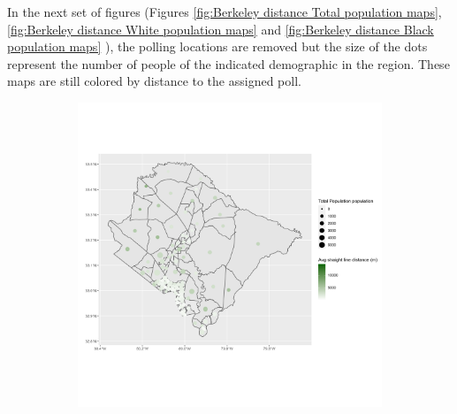 \documentclass[11pt]{article}
\theoremstyle{remark}
\theoremstyle{definition}
\begin{document}
In the next set of figures (Figures \ref{fig:Berkeley distance Total population maps}, \ref{fig:Berkeley distance White population maps} and \ref{fig:Berkeley distance Black population maps} ), the polling locations are removed but the size of the dots represent the number of people of the indicated demographic in the region. These maps are still colored by distance to the assigned poll.

\begin{figure}
	\begin{subfigure}{.5\textwidth}
		\centering
		\includegraphics[width=\linewidth]{result analysis/Berkeley_SC_original_configs/population_pop_and_dist_Berkeley_config_original_2016_polls.png}
		\label{sfig:York_2016_bg_dist_pop}
	\end{subfigure} 
	\begin{subfigure}{.5\textwidth}
		\centering

\end{subfigure}
\end{figure}
\end{document}
